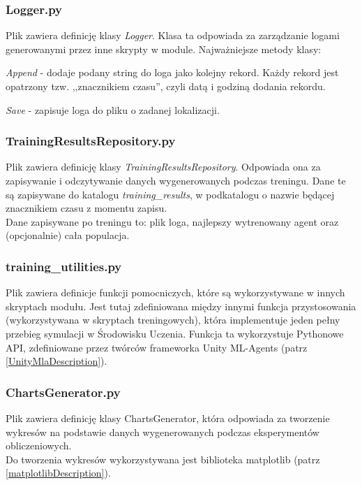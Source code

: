 \subsubsection{Logger.py}
Plik zawiera definicję klasy \textit{Logger}. Klasa ta odpowiada za zarządzanie logami generowanymi przez inne skrypty w module. Najważniejsze metody klasy:
\begin{enumerate*}
\item \textit{Append} - dodaje podany string do loga jako kolejny rekord. Każdy rekord jest opatrzony tzw. ,,znacznikiem czasu'', czyli datą i godziną dodania rekordu.
\item \textit{Save} - zapisuje loga do pliku o zadanej lokalizacji.
\end{enumerate*}

\subsubsection{TrainingResultsRepository.py}
Plik zawiera definicję klasy \textit{TrainingResultsRepository}. Odpowiada ona za zapisywanie i odczytywanie danych wygenerowanych podczas treningu. Dane te są zapisywane do katalogu \textit{training\_results}, w podkatalogu o nazwie będącej znacznikiem czasu z momentu zapisu. \\
Dane zapisywane po treningu to: plik loga, najlepszy wytrenowany agent oraz (opcjonalnie) cała populacja.

\subsubsection{training\_utilities.py}
Plik zawiera definicje funkcji pomocniczych, które są wykorzystywane w innych skryptach modułu. Jest tutaj zdefiniowana między innymi funkcja przystosowania (wykorzystywana w skryptach treningowych), która implementuje jeden pełny przebieg symulacji w Środowisku Uczenia. Funkcja ta wykorzystuje Pythonowe API, zdefiniowane przez twórców frameworka Unity ML-Agents (patrz \ref{UnityMlaDescription}).

\subsubsection{ChartsGenerator.py}
Plik zawiera definicję klasy ChartsGenerator, która odpowiada za tworzenie wykresów na \hfill podstawie \hfill danych \hfill wygenerowanych \hfill podczas \hfill eksperymentów \hfill obliczeniowych. \\
Do tworzenia wykresów wykorzystywana jest biblioteka matplotlib (patrz \ref{matplotlibDescription}).


